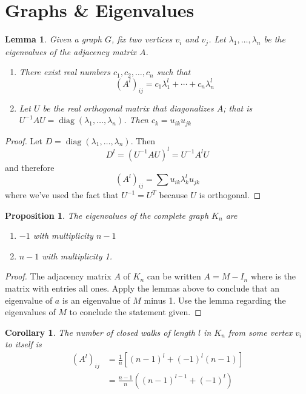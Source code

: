 \documentclass[10pt, letterpaper]{article}
\newtheorem{lemma}{Lemma}
\newtheorem{cor}{Corollary}
\newtheorem{prop}{Proposition}
\theoremstyle{remark}
\theoremstyle{definition}
\begin{document}
    \section{Graphs \& Eigenvalues}

    \begin{lemma}
        Given a graph $G$, fix two vertices $v_i$ and $v_j$. Let $\lambda_1, \ldots , \lambda_n$ be the eigenvalues of the
        adjacency matrix $A$.
        \begin{enumerate}
            \item [(a)] There exist real numbers $c_1, c_2, \ldots , c_n$ such that
            \[
                (A^l)_{ij} = c_1 \lambda_1^l + \cdots + c_n \lambda_n^l
            \]
            \item [(b)] Let $U$ be the real orthogonal matrix that diagonalizes $A$; that is $U^{-1}AU =
            \operatorname{diag}(\lambda_1, \ldots, \lambda_n)$. Then $c_k=u_{ik}u_{jk}$
        \end{enumerate}
    \end{lemma}

    \begin{proof}
        Let $D=\operatorname{diag}(\lambda_1, \ldots, \lambda_n)$. Then
        \[
            D^l = (U^{-1}AU)^l = U^{-1} A^l U
        \]
        and therefore
        \[
            (A^l)_{ij} = \sum u_{ik} \lambda_k^l u_{jk}
        \]
        where we've used the fact that $U^{-1} = U^T$ because $U$ is orthogonal.
    \end{proof}

    \begin{prop}
        The eigenvalues of the complete graph $K_n$  are
        \begin{enumerate}
            \item [(a)] $-1$ with multiplicity $n-1$
            \item [(b)] $n-1$ with multiplicity 1.
        \end{enumerate}
    \end{prop}

    \begin{proof}
        The adjacency matrix $A$ of $K_n$ can be written $A = M - I_n$ where is the matrix with entries all ones. Apply
        the lemmas above to conclude that an eigenvalue of $a$ is an eigenvalue of $M$ minus 1. Use the lemma regarding
        the eigenvalues of $M$ to conclude the statement given.
    \end{proof}

    \begin{cor}
        The number of closed walks of length $l$ in $K_n$ from some vertex $v_i$ to itself is
        \begin{align*}
        (A^l)_{ij} &= \frac{1}{n} [(n-1)^l + (-1)^l(n-1)] \\
                   &= \frac{n-1}{n} ((n-1)^{l-1} + (-1)^l) \\
        \end{align*}
    \end{cor}
\end{document}
